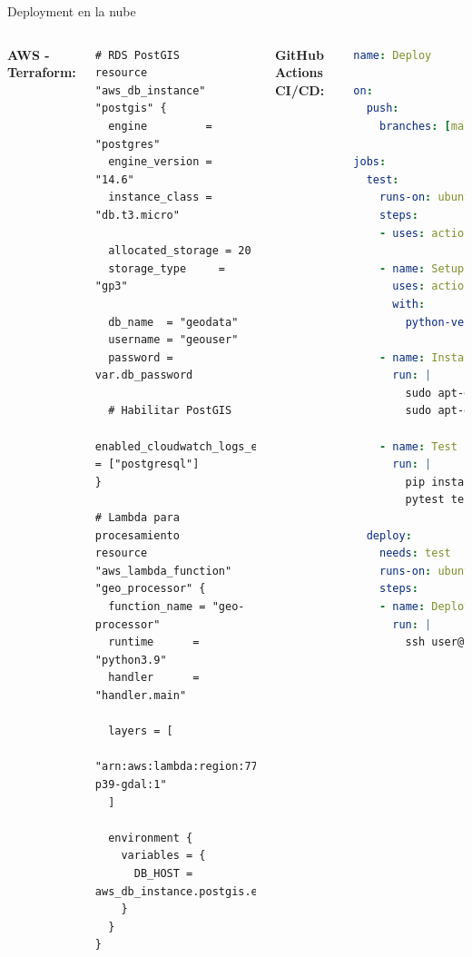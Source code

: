 \documentclass[10pt,aspectratio=169]{beamer}
\begin{document}
\begin{frame}[fragile]{Deployment en la nube}
    \begin{columns}[T]
        \textbf{AWS - Terraform:}
        \begin{lstlisting}[language=HCL]
# RDS PostGIS
resource "aws_db_instance" "postgis" {
  engine         = "postgres"
  engine_version = "14.6"
  instance_class = "db.t3.micro"
  
  allocated_storage = 20
  storage_type     = "gp3"
  
  db_name  = "geodata"
  username = "geouser"
  password = var.db_password
  
  # Habilitar PostGIS
  enabled_cloudwatch_logs_exports = ["postgresql"]
}

# Lambda para procesamiento
resource "aws_lambda_function" "geo_processor" {
  function_name = "geo-processor"
  runtime      = "python3.9"
  handler      = "handler.main"
  
  layers = [
    "arn:aws:lambda:region:770693421928:layer:Klayers-p39-gdal:1"
  ]
  
  environment {
    variables = {
      DB_HOST = aws_db_instance.postgis.endpoint
    }
  }
}
        \end{lstlisting}
        
        \textbf{GitHub Actions CI/CD:}
        \begin{lstlisting}[language=yaml]
name: Deploy

on:
  push:
    branches: [main]

jobs:
  test:
    runs-on: ubuntu-latest
    steps:
    - uses: actions/checkout@v2
    
    - name: Setup Python
      uses: actions/setup-python@v2
      with:
        python-version: '3.9'
    
    - name: Install GDAL
      run: |
        sudo apt-get update
        sudo apt-get install -y gdal-bin
    
    - name: Test
      run: |
        pip install -r requirements.txt
        pytest tests/
  
  deploy:
    needs: test
    runs-on: ubuntu-latest
    steps:
    - name: Deploy to server
      run: |
        ssh user@server "cd /app && 
                        git pull && 
                        docker-compose up -d"
        \end{lstlisting}
    \end{columns}
\end{frame}
\end{document}
